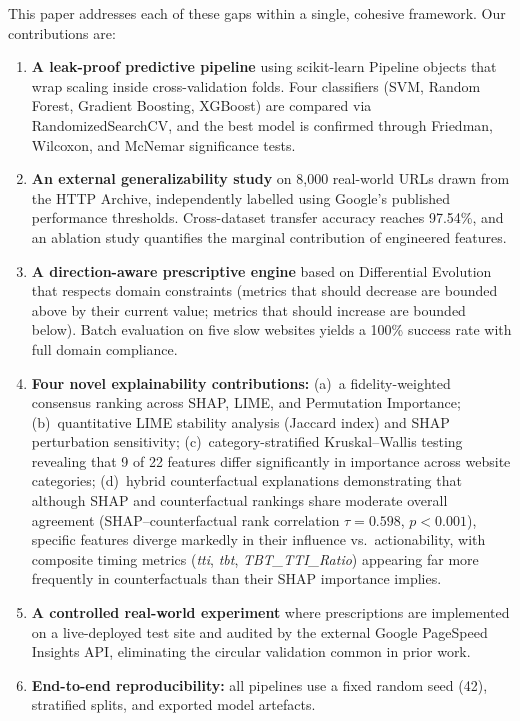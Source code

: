 \documentclass[sn-nature]{sn-jnl}
\begin{document}
This paper addresses each of these gaps within a single, cohesive framework. Our contributions are:

\begin{enumerate}
    \item \textbf{A leak-proof predictive pipeline} using scikit-learn Pipeline objects that wrap scaling inside cross-validation folds. Four classifiers (SVM, Random Forest, Gradient Boosting, XGBoost) are compared via RandomizedSearchCV, and the best model is confirmed through Friedman, Wilcoxon, and McNemar significance tests.

    \item \textbf{An external generalizability study} on 8,000 real-world URLs drawn from the HTTP Archive, independently labelled using Google's published performance thresholds. Cross-dataset transfer accuracy reaches 97.54\%, and an ablation study quantifies the marginal contribution of engineered features.

    \item \textbf{A direction-aware prescriptive engine} based on Differential Evolution that respects domain constraints (metrics that should decrease are bounded above by their current value; metrics that should increase are bounded below). Batch evaluation on five slow websites yields a 100\% success rate with full domain compliance.

    \item \textbf{Four novel explainability contributions:} (a)~a fidelity-weighted consensus ranking across SHAP, LIME, and Permutation Importance; (b)~quantitative LIME stability analysis (Jaccard index) and SHAP perturbation sensitivity; (c)~category-stratified Kruskal--Wallis testing revealing that 9 of 22 features differ significantly in importance across website categories; (d)~hybrid counterfactual explanations demonstrating that although SHAP and counterfactual rankings share moderate overall agreement (SHAP--counterfactual rank correlation $\tau = 0.598$, $p < 0.001$), specific features diverge markedly in their influence vs.\ actionability, with composite timing metrics (\textit{tti}, \textit{tbt}, \textit{TBT\_TTI\_Ratio}) appearing far more frequently in counterfactuals than their SHAP importance implies.

    \item \textbf{A controlled real-world experiment} where prescriptions are implemented on a live-deployed test site and audited by the external Google PageSpeed Insights API, eliminating the circular validation common in prior work.

    \item \textbf{End-to-end reproducibility:} all pipelines use a fixed random seed (42), stratified splits, and exported model artefacts.
\end{enumerate}
\end{document}
